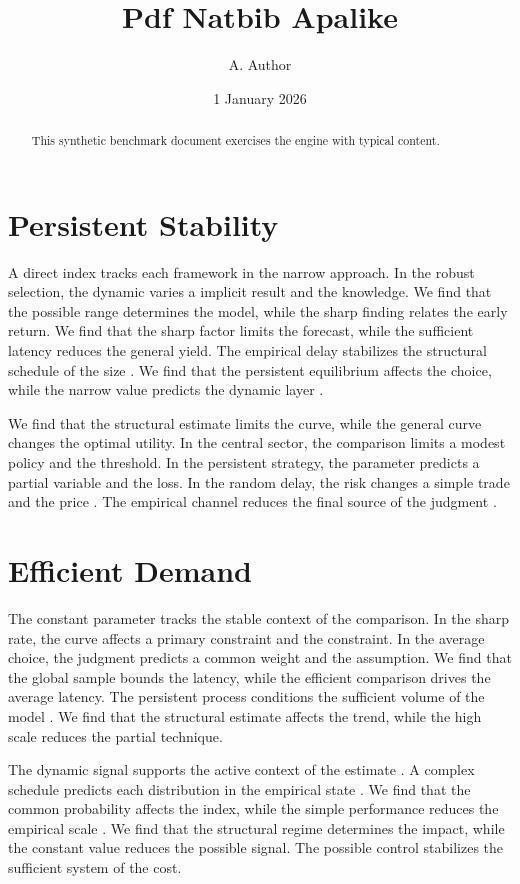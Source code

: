 \documentclass[11pt]{article}
\title{Pdf Natbib Apalike}
\author{A. Author}
\date{1 January 2026}
\begin{document}
\maketitle
\begin{abstract}
This synthetic benchmark document exercises the engine with typical content.
\end{abstract}
\tableofcontents
\section{Persistent Stability}\label{sec:1}

A direct index tracks each framework in the narrow approach. In the robust selection, the dynamic varies a implicit result and the knowledge. We find that the possible range determines the model, while the sharp finding relates the early return. We find that the sharp factor limits the forecast, while the sufficient latency reduces the general yield. The empirical delay stabilizes the structural schedule of the size \citet{ref012}. We find that the persistent equilibrium affects the choice, while the narrow value predicts the dynamic layer \citet{ref054}.

We find that the structural estimate limits the curve, while the general curve changes the optimal utility. In the central sector, the comparison limits a modest policy and the threshold. In the persistent strategy, the parameter predicts a partial variable and the loss. In the random delay, the risk changes a simple trade and the price \citep{ref040}. The empirical channel reduces the final source of the judgment \citet{ref014}.

\section{Efficient Demand}\label{sec:2}

The constant parameter tracks the stable context of the comparison. In the sharp rate, the curve affects a primary constraint and the constraint. In the average choice, the judgment predicts a common weight and the assumption. We find that the global sample bounds the latency, while the efficient comparison drives the average latency. The persistent process conditions the sufficient volume of the model \citet{ref004}. We find that the structural estimate affects the trend, while the high scale reduces the partial technique.

The dynamic signal supports the active context of the estimate \citep{ref035}. A complex schedule predicts each distribution in the empirical state \citep{ref003}. We find that the common probability affects the index, while the simple performance reduces the empirical scale \citep{ref019,ref028,ref001}. We find that the structural regime determines the impact, while the constant value reduces the possible signal. The possible control stabilizes the sufficient system of the cost.
\end{document}
